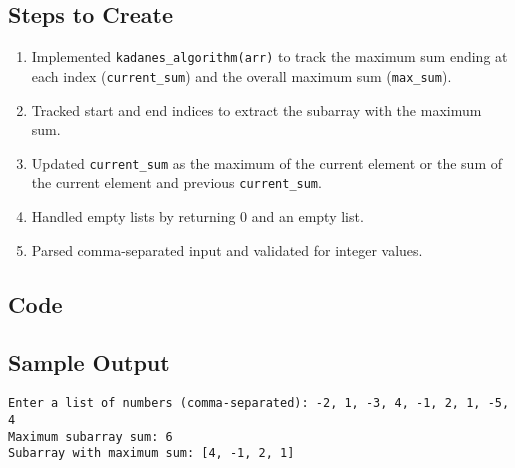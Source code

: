 \documentclass[a4paper,12pt]{article}
\begin{document}
\subsection{Steps to Create}
\begin{enumerate}
    \item Implemented \texttt{kadanes\_algorithm(arr)} to track the maximum sum ending at each index (\texttt{current\_sum}) and the overall maximum sum (\texttt{max\_sum}).
    \item Tracked start and end indices to extract the subarray with the maximum sum.
    \item Updated \texttt{current\_sum} as the maximum of the current element or the sum of the current element and previous \texttt{current\_sum}.
    \item Handled empty lists by returning 0 and an empty list.
    \item Parsed comma-separated input and validated for integer values.
\end{enumerate}

\subsection{Code}


\subsection{Sample Output}
\begin{verbatim}
Enter a list of numbers (comma-separated): -2, 1, -3, 4, -1, 2, 1, -5, 4
Maximum subarray sum: 6
Subarray with maximum sum: [4, -1, 2, 1]
\end{verbatim}
\end{document}
